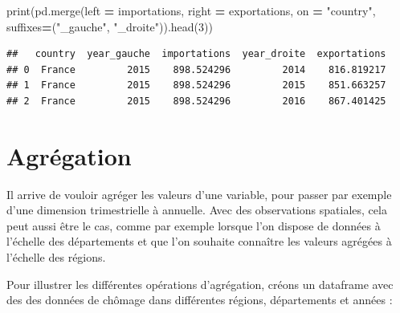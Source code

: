 \documentclass[12pt,]{book}
\newenvironment{Shaded}{\begin{snugshade}}{\end{snugshade}}
\newcommand{\DecValTok}[1]{\textcolor[rgb]{0.00,0.00,0.81}{#1}}
\newcommand{\StringTok}[1]{\textcolor[rgb]{0.31,0.60,0.02}{#1}}
\newcommand{\OperatorTok}[1]{\textcolor[rgb]{0.81,0.36,0.00}{\textbf{#1}}}
\newcommand{\BuiltInTok}[1]{#1}
\newcommand{\NormalTok}[1]{#1}
\numberwithin{equation}{section}
\numberwithin{countremarque}{section}
\begin{document}
\begin{Shaded}
\begin{Highlighting}[]
\BuiltInTok{print}\NormalTok{(pd.merge(left }\OperatorTok{=}\NormalTok{ importations, right }\OperatorTok{=}\NormalTok{ exportations,}
\NormalTok{               on }\OperatorTok{=} \StringTok{"country"}\NormalTok{,}
\NormalTok{               suffixes}\OperatorTok{=}\NormalTok{(}\StringTok{"_gauche"}\NormalTok{, }\StringTok{"_droite"}\NormalTok{)).head(}\DecValTok{3}\NormalTok{))}
\end{Highlighting}
\end{Shaded}

\begin{lstlisting}
##   country  year_gauche  importations  year_droite  exportations
## 0  France         2015    898.524296         2014    816.819217
## 1  France         2015    898.524296         2015    851.663257
## 2  France         2015    898.524296         2016    867.401425
\end{lstlisting}

\section{Agrégation}\label{agregation}

Il arrive de vouloir agréger les valeurs d'une variable, pour passer par
exemple d'une dimension trimestrielle à annuelle. Avec des observations
spatiales, cela peut aussi être le cas, comme par exemple lorsque l'on
dispose de données à l'échelle des départements et que l'on souhaite
connaître les valeurs agrégées à l'échelle des régions.

Pour illustrer les différentes opérations d'agrégation, créons un
dataframe avec des des données de chômage dans différentes régions,
départements et années :
\end{document}
